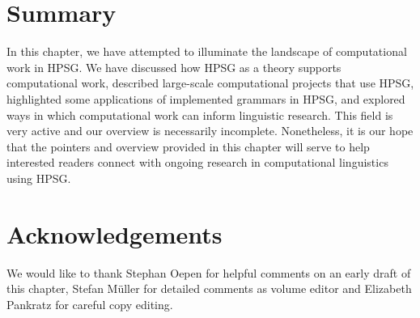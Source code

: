 \documentclass[output=paper
	        ,collection
	        ,collectionchapter
 	        ,biblatex
                ,babelshorthands
                ,newtxmath
                ,draftmode
                ,colorlinks, citecolor=brown
]{langscibook}
\begin{document}
\section{Summary}

In this chapter, we have attempted to illuminate the landscape of
computational work in HPSG. We have discussed how HPSG as a theory
supports computational work, described large-scale computational
projects that use HPSG, highlighted some applications of implemented
grammars in HPSG, and explored ways in which computational work can
inform linguistic research. This field is very active and our overview is
necessarily incomplete. Nonetheless, it is our hope that the pointers
and overview provided in this chapter will serve to help interested readers
connect with ongoing research in computational linguistics using HPSG.



\section*{Acknowledgements}

We would like to thank Stephan Oepen for helpful comments on an early
draft of this chapter, Stefan Müller for detailed comments as
volume editor and Elizabeth Pankratz for careful copy editing.

{\sloppy
\printbibliography[heading=subbibliography,notkeyword=this] 
}
\end{document}
